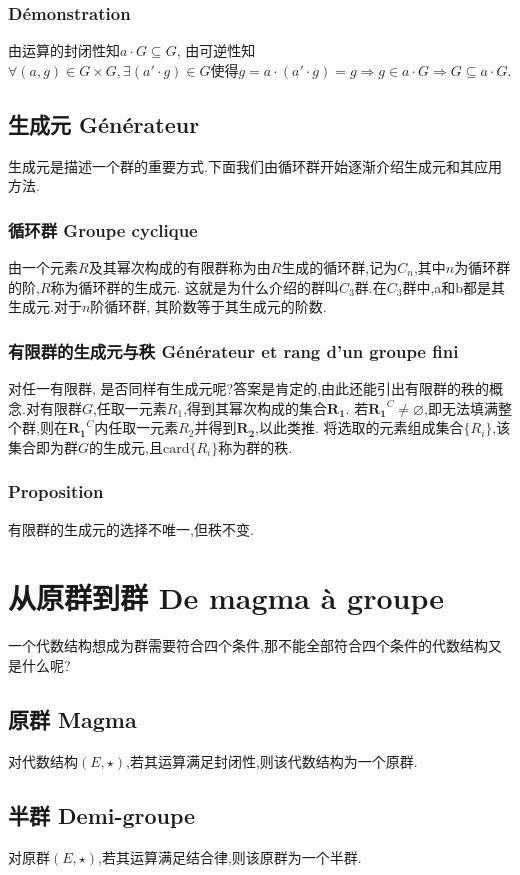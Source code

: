 \documentclass[12pt, a4paper, oneside]{ctexbook}
\newcommand{\n }{$n$}\newcommand{\f  }{$ f $}
\begin{document}
  \subsubsection{Démonstration}
  由运算的封闭性知$a\cdot G\subseteq G$,
  由可逆性知$\forall (a,g)\in G\times G, \exists (a'\cdot g)\in G\text{使得}g=a\cdot (a'\cdot g)=g\Rightarrow g\in a\cdot G\Rightarrow G\subseteq a\cdot G$.
  \subsection{生成元 Générateur}
  生成元是描述一个群的重要方式.下面我们由循环群开始逐渐介绍生成元和其应用方法.
  \subsubsection{循环群 Groupe cyclique}
  由一个元素$R$及其幂次构成的有限群称为由$R$生成的循环群,记为$C_n$,其中\n 为循环群的阶,$R$称为循环群的生成元.
  这就是为什么介绍的群叫$C_3$群.在$C_3$群中,a和b都是其生成元.对于\n 阶循环群, 其阶数等于其生成元的阶数.
  \subsubsection{有限群的生成元与秩 Générateur et rang d'un groupe fini}
  对任一有限群, 是否同样有生成元呢?答案是肯定的,由此还能引出有限群的秩的概念.对有限群$G$,任取一元素$R_1$,得到其幂次构成的集合$\mathbf{R_1}$.
  若$\mathbf{R_1}^C\neq \varnothing$,即无法填满整个群,则在$\mathbf{R_1}^C$内任取一元素$R_2$并得到$\mathbf{R_2}$,以此类推.
  将选取的元素组成集合$\{R_i\}$,该集合即为群$G$的生成元,且$\text{card}\{R_i\}$称为群的秩.
  \subsubsection{Proposition}
  有限群的生成元的选择不唯一,但秩不变.

  \section{从原群到群 De magma à groupe}
  一个代数结构想成为群需要符合四个条件,那不能全部符合四个条件的代数结构又是什么呢?
  \subsection{原群 Magma}
  对代数结构$(E,\star)$,若其运算满足封闭性,则该代数结构为一个原群.

  \subsection{半群 Demi-groupe}
  对原群$(E,\star)$,若其运算满足结合律,则该原群为一个半群.
\end{document}
